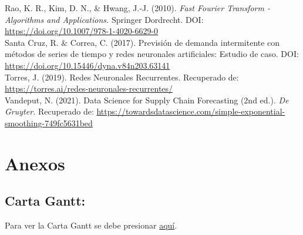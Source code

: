 \documentclass[10pt]{article}
\begin{document}
Rao, K. R., Kim, D. N., $\&$ Hwang, J.-J. (2010). \textit{Fast Fourier Transform - Algorithms and Applications.} Springer Dordrecht. DOI: \href{https://doi.org/10.1007/978-1-4020-6629-0}{https://doi.org/10.1007/978-1-4020-6629-0} \\ 

Santa Cruz, R. $\&$ Correa, C. (2017). Previsión de demanda intermitente con métodos de series de tiempo y redes neuronales artificiales: Estudio de caso. DOI: \href{https://doi.org/10.15446/dyna.v84n203.63141}{https://doi.org/10.15446/dyna.v84n203.63141} \\

Torres, J. (2019). Redes Neuronales Recurrentes. Recuperado de: \href{https://torres.ai/redes-neuronales-recurrentes/}{https://torres.ai/redes-neuronales-recurrentes/} \\

Vandeput, N. (2021). Data Science for Supply Chain Forecasting (2nd ed.). \textit{De Gruyter.} Recuperado de: \href{https://towardsdatascience.com/simple-exponential-smoothing-749fc5631bed}{https://towardsdatascience.com/simple-exponential-smoothing-749fc5631bed}






\newpage
\section{Anexos}
\subsection{Carta Gantt:}
Para ver la Carta Gantt se debe presionar \href{https://uccl0-my.sharepoint.com/:x:/r/personal/mtago_uc_cl/_layouts/15/Doc.aspx?sourcedoc=%7BBBFA9B63-7895-461D-AF00-714DC960626F%7D&file=Carta%20Gantt.xlsx&action=default&mobileredirect=true}{aquí}.
\end{document}
